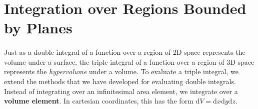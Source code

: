 \documentclass[../multivariate_calculus.tex]{subfiles}
\begin{document}
    \section{Integration over Regions Bounded by Planes}
        \paragraph{}
        Just as a double integral of a function over a region of 2D space represents the volume under a surface, the triple integral of a function over a region of 3D space represents the \textit{hypervolume} under a volume.
        To evaluate a triple integral, we extend the methods that we have developed for evaluating double integrals.
        Instead of integrating over an infinitesimal area element, we integrate over a \textbf{volume element}.
        In cartesian coordinates, this has the form $\mathrm{d}V=\mathrm{d}x\mathrm{d}y\mathrm{d}z$.
\end{document}
